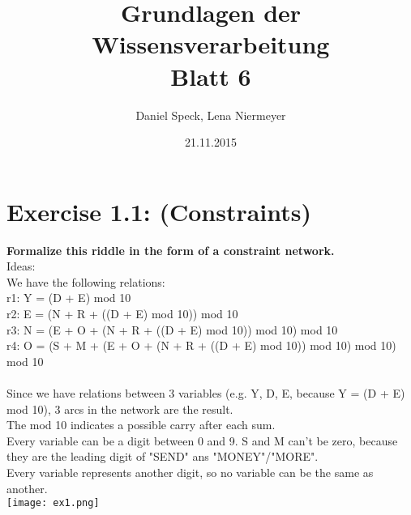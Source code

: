 \documentclass[10pt,a4paper]{article}
\title{\textbf{\huge Grundlagen der Wissensverarbeitung
		\\\Large Blatt 6}}
\author{Daniel Speck, Lena Niermeyer}
\date{21.11.2015}
\begin{document}
		
	\maketitle
		
	\section*{Exercise 1.1: (Constraints)}
	

\textbf{Formalize this riddle in the form of a constraint network.}
\\
Ideas: \\
We have the following relations: \\
r1: Y = (D + E) mod 10 \\
r2: E = (N + R + ((D + E) mod 10)) mod 10 \\
r3: N = (E + O + (N + R + ((D + E) mod 10)) mod 10) mod 10 \\
r4: O = (S + M + (E + O + (N + R + ((D + E) mod 10)) mod 10) mod 10) mod 10 \\ \\

Since we have relations between 3 variables (e.g. Y, D, E, because Y = (D + E) mod 10), 3 arcs in the network are the result. \\
The mod 10 indicates a possible carry after each sum. \\
Every variable can be a digit between 0 and 9. S and M can't be zero, because they are the leading digit of "SEND" ans "MONEY"/"MORE". \\
Every variable represents another digit, so no variable can be the same as another. \\




	\texttt{[image: ex1.png]} \\
	
	
\end{document}
